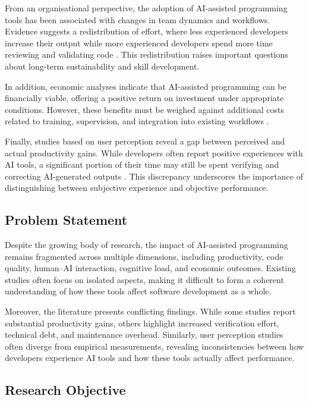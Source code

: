 \documentclass[conference]{IEEEtran}
\begin{document}
From an organisational perspective, the adoption of AI-assisted programming tools has been associated with changes in team dynamics and workflows. Evidence suggests a redistribution of effort, where less experienced developers increase their output while more experienced developers spend more time reviewing and validating code \cite{koripalli_copilot_2025}. This redistribution raises important questions about long-term sustainability and skill development.

In addition, economic analyses indicate that AI-assisted programming can be financially viable, offering a positive return on investment under appropriate conditions. However, these benefits must be weighed against additional costs related to training, supervision, and integration into existing workflows \cite{rodriguez_comparative_nodate}.

Finally, studies based on user perception reveal a gap between perceived and actual productivity gains. While developers often report positive experiences with AI tools, a significant portion of their time may still be spent verifying and correcting AI-generated outputs \cite{lyu_my_2025}. This discrepancy underscores the importance of distinguishing between subjective experience and objective performance.

\subsection{Problem Statement}

Despite the growing body of research, the impact of AI-assisted programming remains fragmented across multiple dimensions, including productivity, code quality, human--AI interaction, cognitive load, and economic outcomes. Existing studies often focus on isolated aspects, making it difficult to form a coherent understanding of how these tools affect software development as a whole.

Moreover, the literature presents conflicting findings. While some studies report substantial productivity gains, others highlight increased verification effort, technical debt, and maintenance overhead. Similarly, user perception studies often diverge from empirical measurements, revealing inconsistencies between how developers experience AI tools and how these tools actually affect performance.

\subsection{Research Objective}
\end{document}
